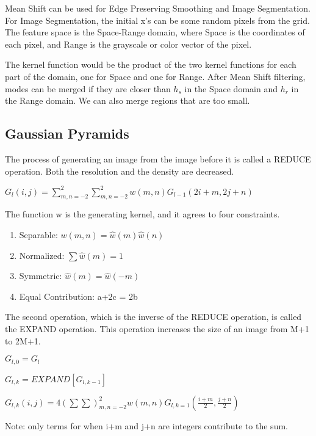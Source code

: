 \documentclass{article}
\begin{document}
\begin{multicols}{2}
\vspace{2mm}

Mean Shift can be used for Edge Preserving Smoothing and Image Segmentation. For Image Segmentation, the initial x's can be some random pixels from the grid. The feature space is the Space-Range domain, where Space is the coordinates of each pixel, and Range is the grayscale or color vector of the pixel.

\vspace{2mm}

The kernel function would be the product of the two kernel functions for each part of the domain, one for Space and one for Range. After Mean Shift filtering, modes can be merged if they are closer than $h_s$ in the Space domain and $h_r$ in the Range domain. We can also merge regions that are too small.

\subsection{Gaussian Pyramids}

The process of generating an image from the image before it is called a REDUCE operation. Both the resolution and the density are decreased.

$G_l(i,j) = \sum _{m,n = -2}^2 \sum _{m,n = -2}^2 w(m,n) G_{l-1} (2i+m, 2j+n)$

The function w is the generating kernel, and it agrees to four constraints.

\begin{enumerate}
  \item {Separable: $w(m,n) = \hat{w}(m)\hat{w}(n)$}
  \item {Normalized: $\sum \hat{w}(m) = 1$}
  \item {Symmetric: $\hat{w}(m) = \hat{w}(-m)$}
  \item {Equal Contribution: a+2c = 2b}
\end{enumerate}

The second operation, which is the inverse of the REDUCE operation, is called the EXPAND operation. This operation increases the size of an image from M+1 to 2M+1.

$G_{l,0} = G_l$

$G_{l,k} = EXPAND[G_{l,k-1}]$

$G_{l,k}(i,j) = 4(\sum \sum)_{m,n = -2}^2 w(m,n) G_{l,k=1}(\frac{i+m}{2}, \frac{j+n}{2})$ 

Note: only terms for when i+m and j+n are integers contribute to the sum.


\end{multicols}
\end{document}
